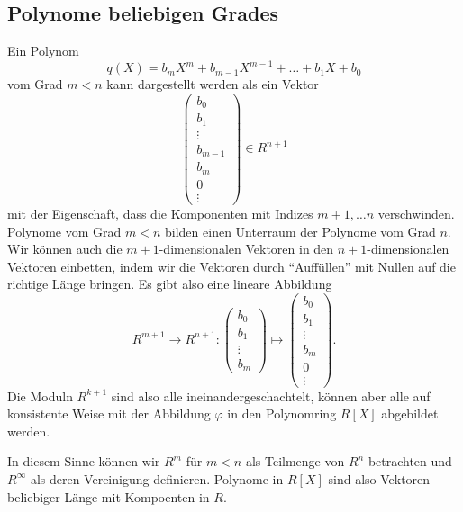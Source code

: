 \subsection{Polynome beliebigen Grades
\label{buch:subsection:polynome:beliebigergrad}}
Ein Polynom
\[
q(X)
=
b_mX^m + b_{m-1}X^{m-1} + \dots + b_1X + b_0
\]
vom Grad $m<n$ kann dargestellt werden als ein Vektor
\[
\begin{pmatrix}
b_0\\
b_1\\
\vdots\\
b_{m-1}\\
b_{m}\\
0\\
\vdots
\end{pmatrix}
\in
R^{n+1}
\]
mit der Eigenschaft, dass die Komponenten mit Indizes
$m+1,\dots n$ verschwinden.
Polynome vom Grad $m<n$ bilden einen Unterraum der Polynome vom Grad $n$.
Wir können auch die $m+1$-dimensionalen Vektoren in den $n+1$-dimensionalen
Vektoren einbetten, indem wir die Vektoren durch ``Auffüllen'' mit Nullen
auf die richtige Länge bringen.
Es gibt also eine lineare Abbildung
\[
R^{m+1} \to R^{n+1}
\colon
\begin{pmatrix}
b_0\\b_1\\\vdots\\b_m
\end{pmatrix}
\mapsto
\begin{pmatrix}
b_0\\b_1\\\vdots\\b_m\\0\\\vdots
\end{pmatrix}
.
\]
Die Moduln $R^{k+1}$ sind also alle ineinandergeschachtelt, können aber
alle auf konsistente Weise mit der Abbildung $\varphi$ in den Polynomring
$R[X]$ abgebildet werden.
\begin{center}
\end{center}
In diesem Sinne können wir $R^m$ für $m<n$ als Teilmenge von $R^n$ betrachten
und $R^\infty$ als deren Vereinigung definieren.
Polynome in $R[X]$ sind also Vektoren beliebiger Länge mit Kompoenten
in $R$.

